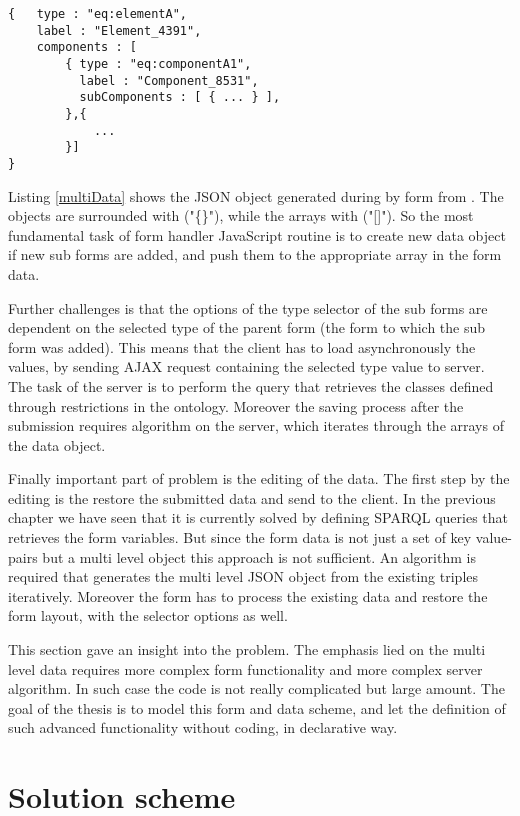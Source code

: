 \begin{lstlisting}[basicstyle=\footnotesize, frame=single, caption={Multi level form data in JSON}, label=multiData, captionpos=b, belowskip=1em, aboveskip=2em]
{	type : "eq:elementA",
	label : "Element_4391",
	components : [
		{ type : "eq:componentA1",
		  label : "Component_8531",	
		  subComponents : [ { ... } ],
		},{ 
			... 
		}]
}
\end{lstlisting}

Listing \ref{multiData} shows the JSON object generated during by form from . The objects are surrounded with ("\{\}"), while the arrays with ("[]"). So the most fundamental task of form handler JavaScript routine is to create new data object if new sub forms are added, and push them to the appropriate array in the form data. 

Further challenges is that the options of the type selector of the sub forms are dependent on the selected type of the parent form (the form to which the sub form was added). This means that the client has to load asynchronously the values, by sending AJAX request containing the selected type value to server. The task of the server is to perform the query that retrieves the classes defined through restrictions in the ontology. Moreover the saving process after the submission requires algorithm on the server, which iterates through the arrays of the data object.

Finally important part of problem is the editing of the data. The first step by the editing is the restore the submitted data and send to the client. In the previous chapter we have seen that it is currently solved by defining  SPARQL queries that retrieves the form variables. But since the form data is not just a set of key value-pairs but a multi level object this approach is not sufficient. An algorithm is required that generates the multi level JSON object from the existing triples iteratively. Moreover the form has to process the existing data and restore the form layout, with the selector options as well. 

This section gave an insight into the problem. The emphasis lied on the multi level data requires more complex form functionality and more complex server algorithm. In such case the code is not really complicated but large amount. The goal of the thesis is to model this form and data scheme, and let the definition of such advanced functionality without coding, in declarative way. 


\section{Solution scheme}




